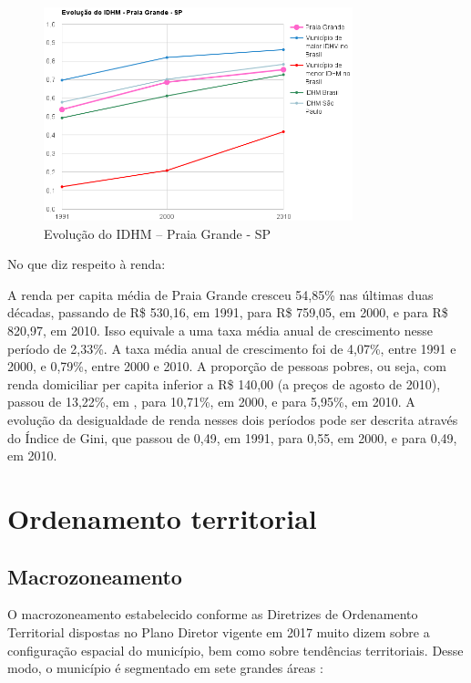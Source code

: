 	\begin{figure}[!htb]
		\centering
		\caption{Evolução do IDHM -- Praia Grande - SP}
		\includegraphics[width=0.8\textwidth]{img/atlas2017a_01.png}
	\end{figure}
	
	No que diz respeito à renda:
	
	\begin{citacao}
		A renda per capita média de Praia Grande cresceu 54,85\% nas últimas duas décadas, passando de R\$ 530,16, em 1991, para R\$ 759,05, em 2000, e para R\$ 820,97, em 2010. Isso equivale a uma taxa média anual de crescimento nesse período de 2,33\%. A taxa média anual de crescimento foi de 4,07\%, entre 1991 e 2000, e 0,79\%, entre 2000 e 2010. A proporção de pessoas pobres, ou seja, com renda domiciliar per capita inferior a R\$ 140,00 (a preços de agosto de 2010), passou de 13,22\%, em 
		, para 10,71\%, em 2000, e para 5,95\%, em 2010. A evolução da desigualdade de renda nesses dois períodos pode ser descrita através do Índice de Gini, que passou de 0,49, em 1991, para 0,55, em 2000, e para 0,49, em 2010.
		\cite{atlas2017a}
	\end{citacao}
	
		
	\section{Ordenamento territorial} \label{ord_territorial}
	
	\subsection{Macrozoneamento}
	
	O macrozoneamento estabelecido conforme as Diretrizes de Ordenamento Territorial dispostas no Plano Diretor vigente em 2017 muito dizem sobre a configuração espacial do município, bem como sobre tendências territoriais. Desse modo, o município é segmentado em sete grandes áreas \cite[Art. 101]{pmpg2016a}: 
	
